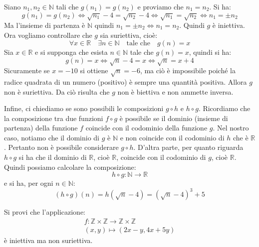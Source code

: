 \begin{itemize}
	Siano $n_{1},n_{2} \in \mathbb{N}$ tali che $g(n_{1})=g(n_{2})$ e proviamo che $n_{1}=n_{2}$. Si ha:
	\begin{displaymath}
		g(n_{1}) = g(n_{2}) \iff \sqrt{n_{1}} -4 = \sqrt{n_{2}}-4 \iff \sqrt{n_{1}} = \sqrt{n_{2}} \iff n_{1} = \pm n_{2}
	\end{displaymath}
	Ma l'insieme di partenza è $\mathbb{N}$ quindi $n_{1} = \pm n_{2} \iff n_{1} = n_{2}$. Quindi $g$ è iniettiva. Ora vogliamo controllare che $g$ sia suriettiva, cioè:
	\begin{displaymath}
		\forall x \in \mathbb{R} \quad \exists n \in \mathbb{N} \quad \mbox{tale che} \quad g(n)=x
	\end{displaymath}
	Sia $x \in \mathbb{R}$ e si supponga che esista $n \in \mathbb{N}$ tale che $g(n)=x$, quindi si ha:
	\begin{displaymath}
		g(n)=x \iff \sqrt{n}-4 = x \iff \sqrt{n} = x+4
	\end{displaymath}
	Sicuramente se $x=-10$ si ottiene $\sqrt{n}=-6$, ma ciò è impossibile poiché la radice quadrata di un numero (positivo) è sempre una quantità positiva. Allora $g$ non è suriettiva. Da ciò risulta che $g$ non è biettiva e non ammette inversa.
\end{itemize}
Infine, ci chiediamo se sono possibili le composizioni $g \circ h$ e $h \circ g$. Ricordiamo che la composizione tra due funzioni $f \circ g$ è possibile se il dominio (insieme di partenza) della funzione $f$ coincide con il codominio della funzione $g$. Nel nostro caso, notiamo che il dominio di $g$ è $\mathbb{N}$ e non coincide con il codominio di $h$ che è $\mathbb{R}$. Pertanto non è possibile considerare $g \circ h$. D'altra parte, per quanto riguarda $h \circ g$ si ha che il dominio di $\mathbb{R}$, cioè $\mathbb{R}$, coincide con il codominio di $g$, cioè $\mathbb{R}$. Quindi possiamo calcolare la composizione:
\begin{displaymath}
	h \circ g : \mathbb{N} \longrightarrow \mathbb{R}
\end{displaymath}
e si ha, per ogni $n \in \mathbb{N}$:
\begin{displaymath}
	(h \circ g )(n)= h(\sqrt{n}-4)=(\sqrt{n}-4)^{3}+5
\end{displaymath}
\begin{flushright}
	\blacksquare
\end{flushright}
\begin{exsbox}
	Si provi che l'applicazione:
	\begin{align*}
		f: \mathbb{Z} \times \mathbb{Z} \longrightarrow \mathbb{Z} \times \mathbb{Z} \\
		(x,y) \mapsto (2x-y,4x+5y)
	\end{align*}
	è iniettiva ma non suriettiva.
\end{exsbox}
